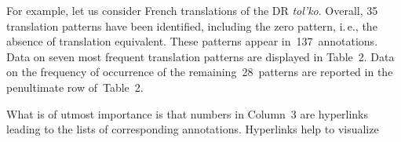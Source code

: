 \begin{multicols}{2}
  
  For example, let us consider French translations of the DR \textit{tol'ko}. Overall, 35 
translation patterns have been identified, including the zero pattern, i.\,e., the absence 
of translation equivalent. These patterns appear in~137~annotations. Data on seven 
most frequent translation patterns are displayed in Table~2. Data on the frequency 
of occurrence of the remaining~28~patterns are reported in the penultimate row 
of~Table~2.
  
 
  
  What is of utmost importance is that numbers in Column~3 are hyperlinks 
leading to the lists of corresponding annotations. Hyperlinks help to visualize\linebreak\vspace*{-12pt}

\pagebreak

\end{multicols}

\addtocounter{figure}{1}
  
\begin{figure*} %
 \vspace*{1pt}
\begin{center}
\mbox{%
\epsfxsize=161.557mm
}
\end{center}
\vspace*{-11pt}
\vspace*{6pt}
\end{figure*}

  
  
